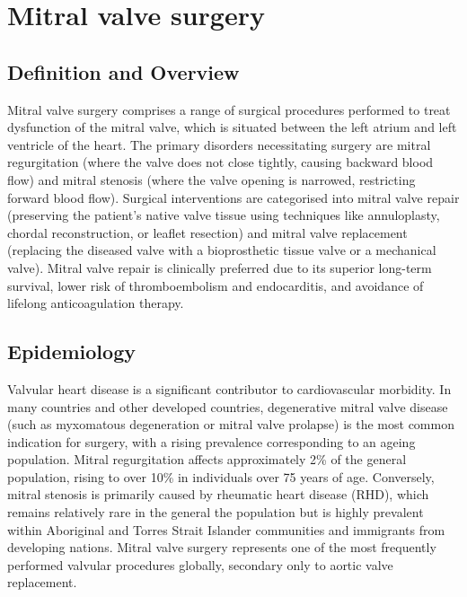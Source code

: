 \chapter{Mitral valve surgery}

\section*{Definition and Overview}
Mitral valve surgery comprises a range of surgical procedures performed to treat dysfunction of the mitral valve, which is situated between the left atrium and left ventricle of the heart. The primary disorders necessitating surgery are mitral regurgitation (where the valve does not close tightly, causing backward blood flow) and mitral stenosis (where the valve opening is narrowed, restricting forward blood flow). Surgical interventions are categorised into mitral valve repair (preserving the patient's native valve tissue using techniques like annuloplasty, chordal reconstruction, or leaflet resection) and mitral valve replacement (replacing the diseased valve with a bioprosthetic tissue valve or a mechanical valve). Mitral valve repair is clinically preferred due to its superior long-term survival, lower risk of thromboembolism and endocarditis, and avoidance of lifelong anticoagulation therapy.

\section*{Epidemiology}
Valvular heart disease is a significant contributor to cardiovascular morbidity. In many countries and other developed countries, degenerative mitral valve disease (such as myxomatous degeneration or mitral valve prolapse) is the most common indication for surgery, with a rising prevalence corresponding to an ageing population. Mitral regurgitation affects approximately 2\% of the general population, rising to over 10\% in individuals over 75 years of age. Conversely, mitral stenosis is primarily caused by rheumatic heart disease (RHD), which remains relatively rare in the general the population but is highly prevalent within Aboriginal and Torres Strait Islander communities and immigrants from developing nations. Mitral valve surgery represents one of the most frequently performed valvular procedures globally, secondary only to aortic valve replacement.


